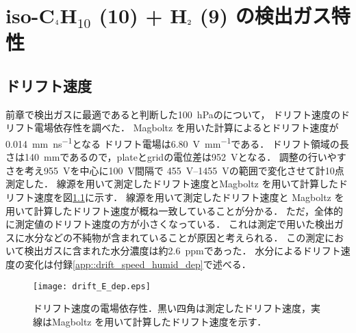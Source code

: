 \documentclass[../master]{subfiles}
\begin{document}
\chapter{iso-C$_{\text 4}$H$_{\text{10}}$ (10) + H$_{\text 2}$ (9) の検出ガス特性}

\section{ドリフト速度}
前章で検出ガスに最適であると判断した\SI{100}{\hecto\pascal}の\isoButaneHydro について，
ドリフト速度のドリフト電場依存性を調べた．
Magboltz を用いた計算によるとドリフト速度が\SI{0.014}{\milli\metre\per\nano\second}となる
ドリフト電場は\SI{6.80}{\volt\per\milli\metre}である．
ドリフト領域の長さは\SI{140}{\milli\metre}であるので，plateとgridの電位差は\SI{952}{\volt}となる．
調整の行いやすさを考え\SI{955}{\volt}を中心に\SI{100}{\volt}間隔で
\SIrange{455}{1455}{\volt}の範囲で変化させて計10点測定した．
線源を用いて測定したドリフト速度とMagboltz を用いて計算したドリフト速度を図\ref{fig::drift_speed_E_dep}に示す．
線源を用いて測定したドリフト速度と Magboltz を用いて計算したドリフト速度が概ね一致していることが分かる．
ただ，全体的に測定値のドリフト速度の方が小さくなっている．
これは測定で用いた検出ガスに水分などの不純物が含まれていることが原因と考えられる．
この測定において検出ガスに含まれた水分濃度は約2.6~ppmであった．
水分によるドリフト速度の変化は付録\ref{app::drift_speed_humid_dep}で述べる．
\begin{figure}
  \centering
  \texttt{[image: drift\_E\_dep.eps]}
  \caption{ドリフト速度の電場依存性．黒い四角は測定したドリフト速度，実線はMagboltz を用いて計算したドリフト速度を示す．}
  \label{fig::drift_speed_E_dep}
\end{figure}
\end{document}
